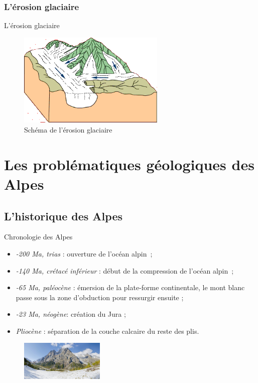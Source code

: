 \documentclass{beamer}
\begin{document}
\subsubsection{L'érosion glaciaire}
\begin{frame}{L'érosion glaciaire}
  \begin{center}
    \begin{figure}
      \includegraphics[width=7cm]{Images/Diapos/Erosion/Glaciaire/Erosion_glaciaire_Bourque4B.png}
      \caption{Schéma de l'érosion glaciaire}
    \end{figure}
  \end{center}
\end{frame}

\section{Les problématiques géologiques des Alpes}

\subsection{L'historique des Alpes}
\begin{frame}{Chronologie des Alpes}
  \begin{itemize}
    \item \textit{-200 Ma, trias} : ouverture de l’océan alpin~;
    \item \textit{-140 Ma, crétacé inférieur} : début de la compression de l’océan alpin~;
    \item \textit{-65 Ma, paléocène} : émersion de la plate-forme continentale, le mont blanc passe sous la zone d'obduction pour ressurgir ensuite ;
    \item \textit{-23 Ma, néogène}: création du Jura ;
    \item \textit{Pliocène} : séparation de la couche calcaire du reste des plis.
  \end{itemize}
  \begin{center}
    \begin{figure}
      \includegraphics[width=4cm]{Images/Images_Alexis/mont_blanc.jpg}
    \end{figure}
  \end{center}
\end{frame}
\end{document}
